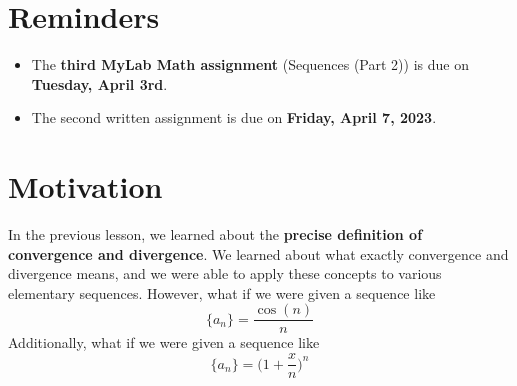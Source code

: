 \documentclass{report}
\begin{document}
\begin{sloppypar}
\section{Reminders}
\begin{itemize}
  \item The \textbf{third MyLab Math assignment} (Sequences
        (Part 2)) is due on \textbf{Tuesday, April 3rd}.
  \item The second written assignment is due on \textbf{
        Friday, April 7, 2023}.
\end{itemize}
\section{Motivation}


In the previous lesson, we learned about the \textbf{precise
  definition of convergence and divergence}. We learned about
what exactly convergence and divergence means, and we were
able to apply these concepts to various elementary sequences.
However, what if we were given a sequence like
\[ \{a_{n}\} = \frac{\cos(n)}{n}\]
Additionally, what if we were given a sequence like
\[ \{a_{n}\} = \Biggr( 1 + \frac{x}{n} \Biggr)^{n}\]


\end{sloppypar}
\end{document}
